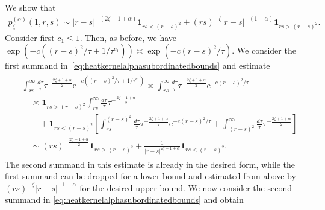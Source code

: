 \documentclass[12pt,reqno,a4paper]{amsart}
\theoremstyle{definition}
\theoremstyle{remark}
\numberwithin{equation}{section}
\newcommand{\1}{\mathbbm{1}}
\newcommand{\me}[1]{\mathrm{e}^{#1}}
\newcommand{\one}{\mathbf{1}}
\begin{document}
We show that 
\begin{align*}
  p_\zeta^{(\alpha)}(1,r,s) \sim |r-s|^{-(2\zeta+1+\alpha)} \one_{rs<(r-s)^2} + (rs)^{-\zeta}|r-s|^{-(1+\alpha)}\one_{rs>(r-s)^2}.
\end{align*}
Consider first $c_1\leq1$. Then, as before, we have $\exp\left(-c((r-s)^2/\tau+1/\tau^{c_1})\right)\asymp\exp(-c(r-s)^2/\tau)$. We consider the first summand in~\eqref{eq:heatkernelalphasubordinatedbounds} and estimate
\begin{align}
  \label{eq:heatkernelalphasubordinatedboundsaux7}
  \begin{split}
    & \int_{rs}^\infty \frac{d\tau}{\tau} \tau^{-\frac{2\zeta+1+\alpha}{2}} \me{-c((r-s)^2/\tau+1/\tau^{c_1})}
    \asymp \int_{rs}^\infty \frac{d\tau}{\tau} \tau^{-\frac{2\zeta+1+\alpha}{2}} \me{-c(r-s)^2/\tau} \\
    & \quad \asymp \one_{rs>(r-s)^2} \int_{rs}^\infty \frac{d\tau}{\tau} \tau^{-\frac{2\zeta+1+\alpha}{2}} \\
    & \qquad + \one_{rs<(r-s)^2} \left[\int_{rs}^{(r-s)^2}\frac{d\tau}{\tau} \tau^{-\frac{2\zeta+1+\alpha}{2}} \me{-c(r-s)^2/\tau} + \int_{(r-s)^2}^\infty \frac{d\tau}{\tau} \tau^{-\frac{2\zeta+1+\alpha}{2}}\right] \\
    & \quad \sim (rs)^{-\frac{2\zeta+1+\alpha}{2}}\one_{rs>(r-s)^2} + \frac{1}{|r-s|^{2\zeta+1+\alpha}}\one_{rs<(r-s)^2}.
  \end{split}
\end{align}
The second summand in this estimate is already in the desired form, while the first summand can be dropped for a lower bound and estimated from above by $(rs)^{-\zeta}|r-s|^{-1-\alpha}$ for the desired upper bound. We now consider the second summand in \eqref{eq:heatkernelalphasubordinatedbounds} and obtain
\end{document}
